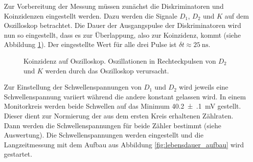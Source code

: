 Zur Vorbereitung der Messung müssen zunächst die Diskriminatoren und Koinzidenzen eingestellt werden. Dazu werden die Signale $D_1$, $D_2$ und $K$ auf dem Oszilloskop betrachtet. Die Dauer der Ausgangspulse der Diskriminatoren wird nun so eingestellt, dass es zur Überlappung, also zur Koinzidenz, kommt (siehe Abbildung \ref{fig:signal_oszi}). Der eingestellte Wert für alle drei Pulse ist $\delta t \approx \SI{25}{\nano\second}$.

\begin{figure}[h]
  \centering
  \caption{Koinzidenz auf Oszilloskop. Oszillationen in Rechteckpulsen von $D_2$ und $K$ werden durch das Oszilloskop verursacht.}
  \label{fig:signal_oszi}
\end{figure}

Zur Einstellung der Schwellenspannungen von $D_1$ und $D_2$ wird jeweils eine Schwellenspannung variiert während die andere konstant gelassen wird. In einem Monitorkreis werden beide Schwellen auf das Minimum \SI[separate-uncertainty = true]{40.2(1)}{\milli\volt} gestellt. Dieser dient zur Normierung der aus dem ersten Kreis erhaltenen Zählraten. Dann werden die Schwellenspannungen für beide Zähler bestimmt (siehe Auswertung). Die Schwellenspannungen werden eingestellt und die Langzeitmessung mit dem Aufbau aus Abbildung \ref{fig:lebensdauer_aufbau} wird gestartet.
